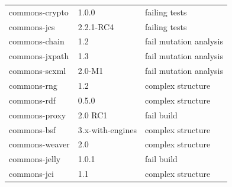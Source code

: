\documentclass[sigconf,review,anonymous]{acmart}
\begin{document}
\begin{table}[t]
{\begin{tabular}{|l|l|l| }
    commons-crypto        & 1.0.0           & failing tests \\
    commons-jcs           & 2.2.1-RC4       & failing tests \\
    commons-chain         & 1.2             & fail mutation analysis \\ %
    commons-jxpath        & 1.3             & fail mutation analysis \\ %
    commons-scxml         & 2.0-M1          & fail mutation analysis \\ %
    commons-rng           & 1.2             & complex structure \\ %
    commons-rdf           & 0.5.0           & complex structure \\ %
    commons-proxy         & 2.0 RC1         & fail build \\ %
    commons-bsf           & 3.x-with-engines & complex structure \\ %
    commons-weaver        & 2.0             & complex structure \\ %
    commons-jelly         & 1.0.1           & fail build \\
    commons-jci           & 1.1             & complex structure \\ %
    \hline
\end{tabular}
}
\label{tbl:fullsubjects}
\end{table}
\end{document}
